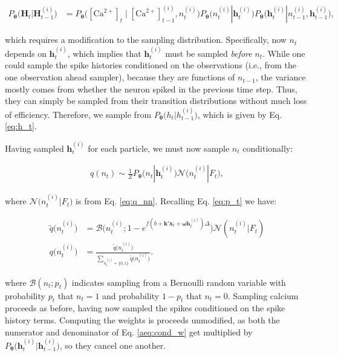 \documentclass[12pt]{article}
\providecommand{\ve}[1]{\boldsymbol{#1}}
\providecommand{\ve}[1]{\boldsymbol{#1}}
\newcommand{\thetn}{\ve{\theta}}
\newcommand{\p}{P_{\thetn}}
\newcommand{\Ca}{[\text{Ca}^{2+}]}
\begin{document}
\begin{align}
\p\big(\ve{H}_t | \ve{H}_{t-1}^{(i)}\big) &= \p\big(\Ca_t \mid \Ca_{t-1}^{(i)}, n_t^{(i)}\big) \p\big(n_t^{(i)} | \ve{h}_t^{(i)}\big) \p\big(\ve{h}_t^{(i)} | n_{t-1}^{(i)}, \ve{h}_{t-1}^{(i)}\big),
\end{align}

\noindent which requires a modification to the sampling distribution.  Specifically, now $n_t$ depends on $\ve{h}_t^{(i)}$, which implies that $\ve{h}_t^{(i)}$ must be sampled \emph{before} $n_t$.  While one could sample the spike histories conditioned on the observations (i.e., from the one observation ahead sampler), because they are functions of $n_{t-1}$, the variance mostly comes from whether the neuron spiked in the previous time step.  Thus, they can simply be sampled from their transition distributions without much loss of efficiency.  Therefore, we sample from $\p\big(h_{t} | h_{t-1}^{(i)}\big)$, which is given by Eq. \ref{eq:h_t}.

Having sampled $\ve{h}_t^{(i)}$ for each particle, we must now sample $n_t$ conditionally:

\begin{align}
q(n_t) \sim \frac{1}{Z} \p\big(n_t | \ve{h}_t^{(i)}\big) \mathcal{N}\big(n_t^{(i)} | F_t\big),
\end{align}

\noindent where $\mathcal{N}\big(n_t^{(i)} | F_t\big)$ is from Eq. \ref{eq:q_nn}.  Recalling Eq. \ref{eq:p_t} we have:

\begin{subequations} \label{aeq:qn1}
\begin{align}
\widetilde{q}\big(n_t^{(i)}\big)&= \mathcal{B}\big(n_t^{(i)}; 1-e^{f(b+\ve{k}'\ve{x}_t+\ve{\omega}\ve{h}_t^{(i)})\Delta} \big)  \mathcal{N}(n_t^{(i)} | F_t)\\
q\big(n_t^{(i)}\big)&=\frac{\widetilde{q}\big(n_t^{(i)}\big)}{\sum_{n_t^{(i)}=\{0,1\}} \widetilde{q}\big(n_t^{(i)}\big)}.
\end{align}
\end{subequations}

\noindent where $\mathcal{B}(n_t; p_t)$ indicates sampling from a Bernoulli random variable with probability $p_t$ that $n_t=1$ and probability $1-p_t$ that $n_t=0$. Sampling calcium proceeds as before, having now sampled the spikes conditioned on the spike history terms.  Computing the weights is proceeds unmodified, as both the numerator and denominator of Eq. \ref{aeq:cond_w} get multiplied by $\p\big(\ve{h}_t^{(i)} | \ve{h}_{t-1}^{(i)}\big)$, so they cancel one another.
\end{document}
